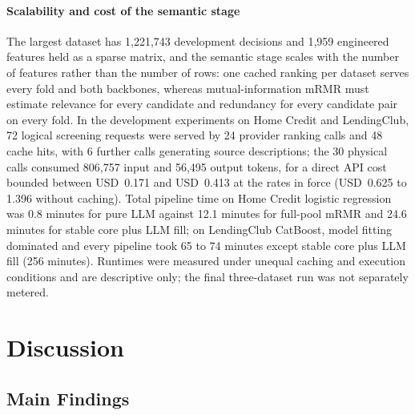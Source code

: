 \documentclass[final,5p,twocolumn]{elsarticle}
\begin{document}
\paragraph{Scalability and cost of the semantic stage}
The largest dataset has 1,221,743 development decisions and 1,959 engineered features held as a sparse matrix, and the semantic stage scales with the number of features rather than the number of rows: one cached ranking per dataset serves every fold and both backbones, whereas mutual-information mRMR must estimate relevance for every candidate and redundancy for every candidate pair on every fold. In the development experiments on Home Credit and LendingClub, 72 logical screening requests were served by 24 provider ranking calls and 48 cache hits, with 6 further calls generating source descriptions; the 30 physical calls consumed 806,757 input and 56,495 output tokens, for a direct API cost bounded between USD~0.171 and USD~0.413 at the rates in force (USD~0.625 to 1.396 without caching). Total pipeline time on Home Credit logistic regression was 0.8 minutes for pure LLM against 12.1 minutes for full-pool mRMR and 24.6 minutes for stable core plus LLM fill; on LendingClub CatBoost, model fitting dominated and every pipeline took 65 to 74 minutes except stable core plus LLM fill (256 minutes). Runtimes were measured under unequal caching and execution conditions and are descriptive only; the final three-dataset run was not separately metered.


\section{Discussion}
\label{sec:discussion}

\subsection{Main Findings}
\label{subsec:main_findings}
\end{document}
